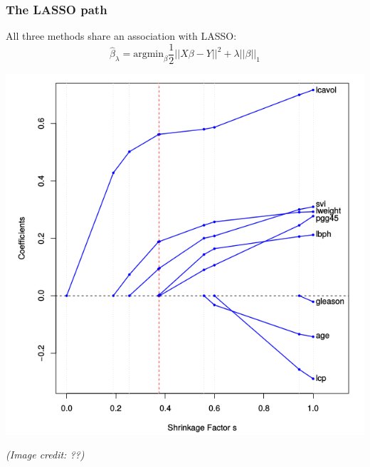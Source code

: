 \documentclass{beamer}
\begin{document}
\begin{frame}
\frametitle{The LASSO path}
All three methods share an association with LASSO:
\[
\hat{\beta}_\lambda = \text{argmin}_\beta \frac{1}{2}||X\beta - Y||^2 + \lambda ||\beta||_1
\]
\begin{center}
\includegraphics[scale = 0.25]{lasso_path.png}
\end{center}
\emph{(Image credit: ??)}
\end{frame}
\end{document}
